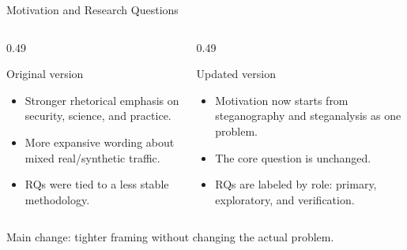 \documentclass[aspectratio=169,11pt]{beamer}
\begin{document}
\begin{frame}{Motivation and Research Questions}
\footnotesize
\begin{columns}[T]
\begin{column}{0.49\textwidth}
\begin{block}{Original version}
\begin{itemize}
\item Stronger rhetorical emphasis on security, science, and practice.
\item More expansive wording about mixed real/synthetic traffic.
\item RQs were tied to a less stable methodology.
\end{itemize}
\end{block}
\end{column}
\begin{column}{0.49\textwidth}
\begin{exampleblock}{Updated version}
\begin{itemize}
\item Motivation now starts from steganography and steganalysis as one problem.
\item The core question is unchanged.
\item RQs are labeled by role: primary, exploratory, and verification.
\end{itemize}
\end{exampleblock}
\end{column}
\end{columns}

\vspace{0.05cm}
{\footnotesize\color{umgray}Main change: tighter framing without changing the actual problem.}
\end{frame}
\end{document}
